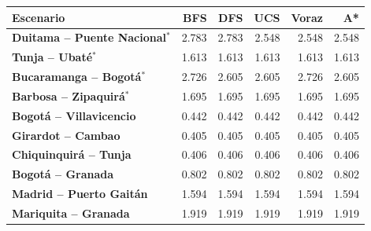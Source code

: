 \renewcommand{\arraystretch}{1.2}
\begin{tabular}{|l|r|r|r|r|r|}
\hline
\rowcolor{gray!20} \textbf{Escenario} & \textbf{BFS} & \textbf{DFS} & \textbf{UCS} & \textbf{Voraz} & \textbf{A*} \\
\hline
\textbf{Duitama -- Puente Nacional$^{*}$} & 2.783 & 2.783 & 2.548 & 2.548 & 2.548 \\
\hline
\textbf{Tunja -- Ubaté$^{*}$} & 1.613 & 1.613 & 1.613 & 1.613 & 1.613 \\
\hline
\textbf{Bucaramanga -- Bogotá$^{*}$} & 2.726 & 2.605 & 2.605 & 2.726 & 2.605 \\
\hline
\textbf{Barbosa -- Zipaquirá$^{*}$} & 1.695 & 1.695 & 1.695 & 1.695 & 1.695 \\
\hline
\textbf{Bogotá -- Villavicencio} & 0.442 & 0.442 & 0.442 & 0.442 & 0.442 \\
\hline
\textbf{Girardot -- Cambao} & 0.405 & 0.405 & 0.405 & 0.405 & 0.405 \\
\hline
\textbf{Chiquinquirá -- Tunja} & 0.406 & 0.406 & 0.406 & 0.406 & 0.406 \\
\hline
\textbf{Bogotá -- Granada} & 0.802 & 0.802 & 0.802 & 0.802 & 0.802 \\
\hline
\textbf{Madrid -- Puerto Gaitán} & 1.594 & 1.594 & 1.594 & 1.594 & 1.594 \\
\hline
\textbf{Mariquita -- Granada} & 1.919 & 1.919 & 1.919 & 1.919 & 1.919 \\
\hline
\end{tabular}
